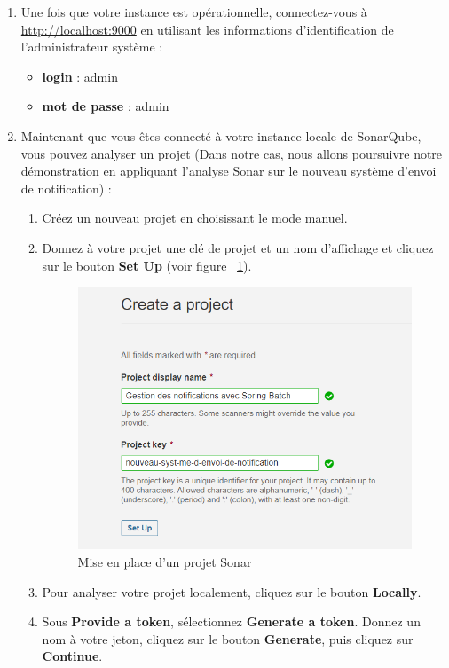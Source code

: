 \begin{enumerate}
    \item Une fois que votre instance est opérationnelle, connectez-vous à \url{http://localhost:9000} en utilisant les informations d'identification de l'administrateur système :
    \begin{itemize}
        \item \textbf{login} : admin
        \item \textbf{mot de passe} : admin
    \end{itemize}
    \item Maintenant que vous êtes connecté à votre instance locale de SonarQube, vous pouvez analyser un projet (Dans notre cas, nous allons poursuivre notre démonstration en appliquant l'analyse Sonar sur le nouveau système d'envoi de notification) :
    \begin{enumerate}
        \item Créez un nouveau projet en choisissant le mode manuel.
        \item Donnez à votre projet une clé de projet et un nom d'affichage et cliquez sur le bouton \textbf{Set Up} (voir figure ~\ref{fig:sonar-1}).
        \begin{figure}[H]
            \begin{center}
                \includegraphics[width=0.75\linewidth]{images/sec5/sonar-1.png}
                \caption{Mise en place d'un projet Sonar}
                \label{fig:sonar-1}
            \end{center} 
        \end{figure}
        \item Pour analyser votre projet localement, cliquez sur le bouton \textbf{Locally}.
        \item Sous \textbf{Provide a token}, sélectionnez \textbf{Generate a token}. Donnez un nom à votre jeton, cliquez sur le bouton \textbf{Generate}, puis cliquez sur \textbf{Continue}.

\end{enumerate}
\end{enumerate}
